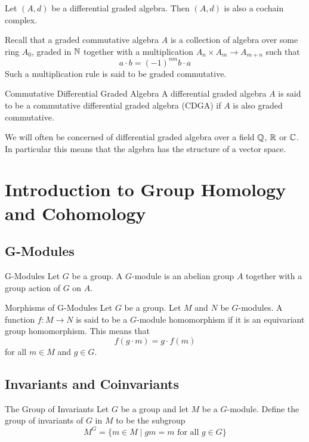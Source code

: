 \documentclass[a4paper]{article}
\begin{document}
\begin{lmm}{}{} Let $(A,d)$ be a differential graded algebra. Then $(A,d)$ is also a cochain complex. 
\end{lmm}

Recall that a graded commutative algebra $A$ is a collection of algebra over some ring $A_0$, graded in $\mathbb{N}$ together with a multiplication $A_n\times A_m\to A_{m+n}$ such that $$a\cdot b=(-1)^{nm}b\cdot a$$ Such a multiplication rule is said to be graded commutative. 

\begin{defn}{Commutative Differential Graded Algebra}{} A differential graded algebra $A$ is said to be a commutative differential graded algebra (CDGA) if $A$ is also graded commutative. 
\end{defn}

We will often be concerned of differential graded algebra over a field $\mathbb{Q}$, $\mathbb{R}$ or $\mathbb{C}$. In particular this means that the algebra has the structure of a vector space. 

\pagebreak
\section{Introduction to Group Homology and Cohomology}
\subsection{G-Modules}
\begin{defn}{G-Modules}{} Let $G$ be a group. A $G$-module is an abelian group $A$ together with a group action of $G$ on $A$. 
\end{defn}

\begin{defn}{Morphisms of G-Modules}{} Let $G$ be a group. Let $M$ and $N$ be $G$-modules. A function $f:M\to N$ is said to be a $G$-module homomorphism if it is an equivariant group homomorphism. This means that $$f(g\cdot m)=g\cdot f(m)$$ for all $m\in M$ and $g\in G$. 
\end{defn}

\subsection{Invariants and Coinvariants}
\begin{defn}{The Group of Invariants}{} Let $G$ be a group and let $M$ be a $G$-module. Define the group of invariants of $G$ in $M$ to be the subgroup $$M^G=\{m\in M\;|\;gm=m\text{ for all }g\in G\}$$
\end{defn}
\end{document}

